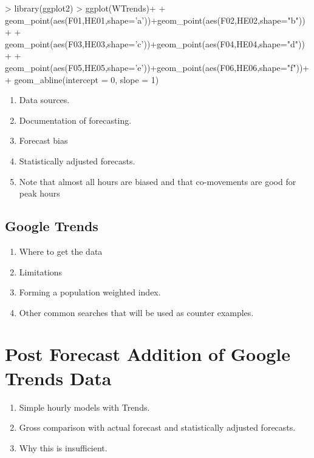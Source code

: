 \documentclass{article}
\begin{document}
\begin{Schunk}
\begin{Sinput}
> library(ggplot2)
> ggplot(WTrends)+
+ geom_point(aes(F01,HE01,shape='a'))+geom_point(aes(F02,HE02,shape="b"))+
+ geom_point(aes(F03,HE03,shape='c'))+geom_point(aes(F04,HE04,shape="d"))+
+ geom_point(aes(F05,HE05,shape='e'))+geom_point(aes(F06,HE06,shape="f"))+
+ geom_abline(intercept = 0, slope = 1)
\end{Sinput}
\end{Schunk}







    \begin{enumerate}
      \item Data sources.
      \item Documentation of forecasting.
      \item Forecast bias
      \item Statistically adjusted forecasts.
      \item Note that almost all hours are biased and that co-movements are good for peak hours
    \end{enumerate}

  \subsection{Google Trends}

    \begin{enumerate}
      \item Where to get the data
      \item Limitations
      \item Forming a population weighted index.
      \item Other common searches that will be used as counter examples.
    \end{enumerate}

\section{Post Forecast Addition of Google Trends Data}

  \begin{enumerate}
    \item Simple hourly models with Trends.
    \item Gross comparison with actual forecast and statistically adjusted forecasts.
    \item Why this is insufficient.
  \end{enumerate}
\end{document}
